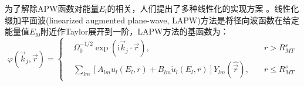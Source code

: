 {%
为了解除APW函数对能量$E_l$的相关，人们提出了多种线性化的实现方案%
。线性化缀加平面波(linearized augmented plane-wave, LAPW)方法是将径向波函数在给定能量值$E_{l0}$附近作Taylor展开到一阶\cite{PRB12-3060_1975}，LAPW方法的基函数为：
\begin{equation}
  \varphi(\vec k_j,\vec r)=\left\{
  \begin{aligned}
	  &\Omega_0^{-1/2}\exp(\mathrm{i}\vec k_j\cdot\vec r),&r>R_{MT}^s\\
    &\sum_{lm}[A_{lm}u_l(E_l,r)+B_{lm}\dot u_l(E_l,r)]Y_{lm}(\hat{\vec r}),\quad&r\leqslant R_{MT}^s
  \end{aligned}\right.
  \label{eq:LAPW-basis}
\end{equation}
}
